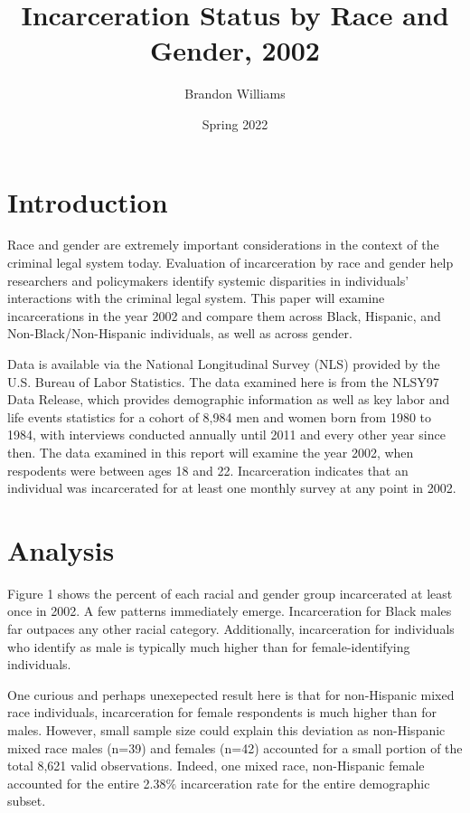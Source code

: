 \documentclass{article}
\author{Brandon Williams}
\title{Incarceration Status by Race and Gender, 2002}
\date{Spring 2022}
\begin{document}
\maketitle

\section{Introduction}

Race and gender are extremely important considerations in the context of the criminal legal system today. Evaluation of incarceration by race and gender help researchers and policymakers identify systemic disparities in individuals' interactions with the criminal legal system. This paper will examine incarcerations in the year 2002 and compare them across Black, Hispanic, and Non-Black/Non-Hispanic individuals, as well as across gender. 

Data is available via the National Longitudinal Survey (NLS) provided by the U.S. Bureau of Labor Statistics. The data examined here is from the NLSY97 Data Release, which provides demographic information as well as key labor and life events statistics for a cohort of 8,984 men and women born from 1980 to 1984, with interviews conducted annually until 2011 and every other year since then. The data examined in this report will examine the year 2002, when respodents were between ages 18 and 22. Incarceration indicates that an individual was incarcerated for at least one monthly survey at any point in 2002. 

\section{Analysis}

Figure 1 shows the percent of each racial and gender group incarcerated at least once in 2002. A few patterns immediately emerge. Incarceration for Black males far outpaces any other racial category. Additionally, incarceration for individuals who identify as male is typically much higher than for female-identifying individuals. 

One curious and perhaps unexepected result here is that for non-Hispanic mixed race individuals, incarceration for female respondents is much higher than for males. However, small sample size could explain this deviation as non-Hispanic mixed race males (n=39) and females (n=42) accounted for a small portion of the total 8,621 valid observations. Indeed, one mixed race, non-Hispanic female accounted for the entire 2.38$\%$ incarceration rate for the entire demographic subset. 
\end{document}
